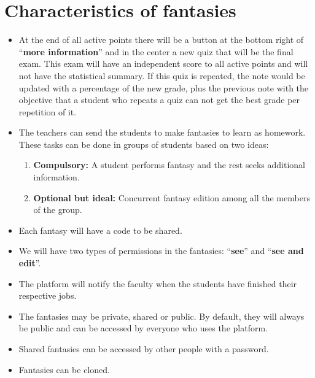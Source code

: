 \section{Characteristics of fantasies}
\begin{itemize}
	\item At the end of all active points there will be a button at the bottom right of ``\textbf{more information}'' and in the center a new quiz that will be the final exam. This exam will have an independent score to all active points and will not have the statistical summary. If this quiz is repeated, the note would be updated with a percentage of the new grade, plus the previous note with the objective that a student who repeats a quiz can not get the best grade per repetition of it.
	\item The teachers can send the students to make fantasies to learn as homework. These tasks can be done in groups of students based on two ideas:
	\begin{enumerate}
		\item \textbf{Compulsory:} A student performs fantasy and the rest seeks additional information.
		\item \textbf{Optional but ideal:} Concurrent fantasy edition among all the members of the group.
	\end{enumerate}
	\item Each fantasy will have a code to be shared.
	\item We will have two types of permissions in the fantasies: ``\textbf{see}'' and ``\textbf{see and edit}''.
	\item The platform will notify the faculty when the students have finished their respective jobs.
	\item The fantasies may be private, shared or public. By default, they will always be public and can be accessed by everyone who uses the platform.
	\item Shared fantasies can be accessed by other people with a password.
	\item Fantasies can be cloned.
\end{itemize}